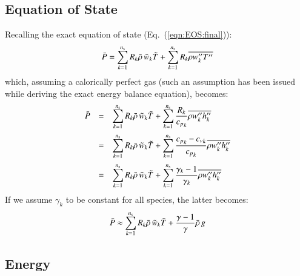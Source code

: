 \documentclass{warpdoc}
\newcommand{\alb}{\vspace{0.2cm}\\} %
\newcommand{\Cv}{{c_{v}}}
\newcommand{\Cp}{{c_{p}}}
\newcommand{\ns}{{{n}_{\rm s}}}
\newcommand{\mfd}{\displaystyle}
\begin{document}
\subsection{Equation of State}

Recalling the exact equation of state (Eq.\ (\ref{eqn:EOS:final})):
%
\begin{equation}
 \wbar{P}
     =   \sum_{k=1}^\ns R_k \wbar{\rho}\,  {\wtilde{w}_k} \wtilde{T}
       + \sum_{k=1}^\ns R_k \overline{\rho w_k^{{\prime\prime}} T^{{\prime\prime}}}
 \label{eqn:EOS:modeled:1}
\end{equation}
%
which, assuming a calorically perfect gas (such an assumption has been issued
while deriving the exact energy balance equation), becomes:
%
\begin{equation}
 \begin{array}{rcl}
   \wbar{P}
    &=&  \mfd\sum_{k=1}^\ns R_k \wbar{\rho}\,  {\wtilde{w}_k} \wtilde{T}
       + \sum_{k=1}^\ns \frac{R_k}{\Cp_k} \overline{\rho w_k^{{\prime\prime}} h_k^{{\prime\prime}}} \alb
     
    &=&  \mfd\sum_{k=1}^\ns R_k \wbar{\rho}\,  {\wtilde{w}_k} \wtilde{T}
       + \sum_{k=1}^\ns \frac{\Cp_k-\Cv_k}{\Cp_k} \overline{\rho w_k^{{\prime\prime}} h_k^{{\prime\prime}}} \alb
     
    &=&  \mfd\sum_{k=1}^\ns R_k \wbar{\rho}\,  {\wtilde{w}_k} \wtilde{T}
       + \sum_{k=1}^\ns \frac{\gamma_k-1}{\gamma_k} \overline{\rho w_k^{{\prime\prime}} h_k^{{\prime\prime}}}
 \end{array}
 \label{eqn:EOS:modeled:2}
\end{equation}
%
If we assume $\gamma_k$ to be constant for all species, the latter becomes:
%
\begin{equation}
 \wbar{P}
     \approx   \sum_{k=1}^\ns R_k \wbar{\rho}\,  {\wtilde{w}_k} \wtilde{T}
       + \frac{\gamma-1}{\gamma} \wbar{\rho}\, g
 \label{eqn:EOS:modeled:3}
\end{equation}
%



\subsection{Energy}
\end{document}
